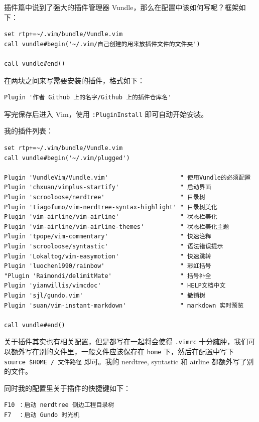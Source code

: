 插件篇中说到了强大的插件管理器 Vundle，那么在配置中该如何写呢？框架如下：

\begin{verbatim}
set rtp+=~/.vim/bundle/Vundle.vim
call vundle#begin('~/.vim/自己创建的用来放插件文件的文件夹')

call vundle#end()
\end{verbatim}

在两块之间来写需要安装的插件，格式如下：

\begin{verbatim}
Plugin '作者 Github 上的名字/Github 上的插件仓库名'
\end{verbatim}

写完保存后进入 Vim，使用 \texttt{:PluginInstall} 即可自动开始安装。

我的插件列表：

\begin{verbatim}
set rtp+=~/.vim/bundle/Vundle.vim
call vundle#begin('~/.vim/plugged')

Plugin 'VundleVim/Vundle.vim'                    " 使用Vundle的必须配置
Plugin 'chxuan/vimplus-startify'                 " 启动界面
Plugin 'scrooloose/nerdtree'                     " 目录树
Plugin 'tiagofumo/vim-nerdtree-syntax-highlight' " 目录树美化
Plugin 'vim-airline/vim-airline'                 " 状态栏美化
Plugin 'vim-airline/vim-airline-themes'          " 状态栏美化主题
Plugin 'tpope/vim-commentary'                    " 快速注释
Plugin 'scrooloose/syntastic'                    " 语法错误提示
Plugin 'Lokaltog/vim-easymotion'                 " 快速跳转
Plugin 'luochen1990/rainbow'                     " 彩虹括号
"Plugin 'Raimondi/delimitMate'                   " 括号补全
Plugin 'yianwillis/vimcdoc'                      " HELP文档中文
Plugin 'sjl/gundo.vim'                           " 撤销树
Plugin 'suan/vim-instant-markdown'               " markdown 实时预览

call vundle#end()
\end{verbatim}

关于插件其实也有相关配置，但是都写在一起将会使得 \texttt{.vimrc} 十分臃肿，我们可以额外写在别的文件里，一般文件应该保存在 \texttt{home} 下，然后在配置中写下 \texttt{source \$HOME / 文件路径} 即可。我的 nerdtree, syntastic 和 airline 都额外写了别的文件。

同时我的配置里关于插件的快捷键如下：

\begin{verbatim}
F10 ：启动 nerdtree 侧边工程目录树
F7  ：启动 Gundo 时光机
\end{verbatim}

